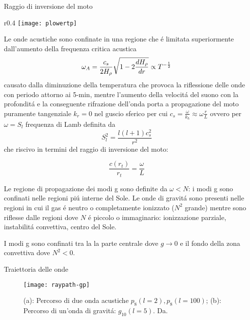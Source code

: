 \begin{frame}{Raggio di inversione del moto}

\begin{wrapfigure}[17]{r}{0.4\textwidth}
\centering
\texttt{[image: plowertp]}
\caption{Andamento del raggio di inversione del moto in funzione del grado l. Da \cite{dal03notes}.}\label{fig:plowertp}
\end{wrapfigure}

Le onde acustiche sono confinate in una regione che \'e limitata superiormente dall'aumento della frequenza critica acustica
\begin{equation}
\omega_A=\frac{c_s}{2H_{\rho}{}}\sqrt{1-2\frac{d H_{\rho}{}}{d r}}\propto T^{-\frac{1}{2}}\label{eq:acusticcutoff}
\end{equation}
 causato dalla diminuzione della temperatura che provoca la riflessione delle onde con periodo attorno ai 5-min, mentre l'aumento della velocit\'a del suono con la profondit\'a e la conseguente rifrazione dell'onda porta a propagazione del moto puramente tangenziale $k_r=0$ nel guscio sferico per cui $c_s=\frac{\omega}{k_h}\approx\omega \frac{r}{L}$ ovvero per $\omega=S_l$ frequenza di Lamb definita da
\begin{equation}
S_l^2=\frac{l(l+1)c_s^2}{r^2}\label{eq:Lambf}
\end{equation}
che riscivo in termini del raggio di inversione del moto:

\begin{equation}
\frac{c(r_t)}{r_t}=\frac{\omega}{L}
\end{equation}

Le regione di propagazione dei modi g sono definite da $\omega<N$: i modi g sono confinati nelle regioni pi\'u interne del Sole.
Le onde di gravit\'a sono presenti nelle regioni in cui il gas \'e neutro o completamente ionizzato ($N^2$ grande) mentre sono riflesse dalle regioni dove $N$ \'e piccolo o immaginario: ionizzazione parziale, instabilit\'a convettiva, centro del Sole.

I modi g sono confinati tra la la parte centrale dove $g\to0$ e il fondo della zona convettiva dove $N^2<0$.

\end{frame}

\begin{frame}{Traiettoria delle onde}

\begin{figure}[!ht]
\texttt{[image: raypath-gp]}
\caption{(a): Percorso di due onda acustiche $p_8(l=2), p_8(l=100)$; (b): Percorso di un'onda di gravit\'a: $g_{10}(l=5)$. Da\cite{gou91seismic}.}
\end{figure}

\end{frame}

